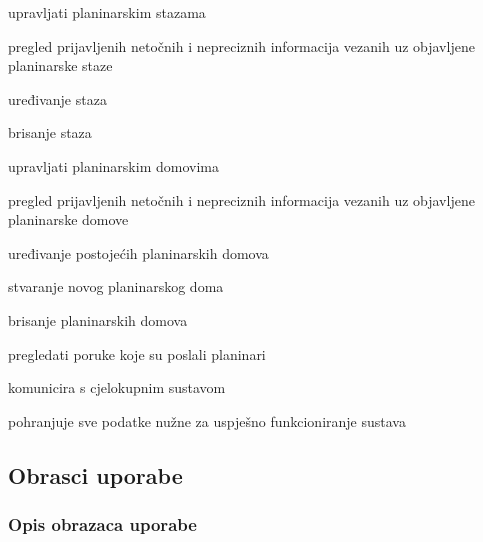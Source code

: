 \begin{packed_enum}
\begin{packed_enum}
\begin{packed_enum}
					\end{packed_enum}
					\item upravljati planinarskim stazama
						\begin{packed_enum}
							\item pregled prijavljenih netočnih i nepreciznih informacija vezanih uz objavljene planinarske staze
							\item uređivanje staza
							\item brisanje staza
						\end{packed_enum}	
					\item upravljati planinarskim domovima
					\begin{packed_enum}
						\item pregled prijavljenih netočnih i nepreciznih informacija vezanih uz objavljene planinarske domove
						\item uređivanje postojećih planinarskih domova
						\item stvaranje novog planinarskog doma
						\item brisanje planinarskih domova
					\end{packed_enum}
					\item pregledati poruke koje su poslali planinari
					
				\end{packed_enum}
	
				\item  {}
				
					\begin{packed_enum}
						
						\item komunicira s cjelokupnim sustavom
						\item pohranjuje sve podatke nužne za uspješno funkcioniranje sustava
						
					\end{packed_enum}
			\end{packed_enum}
			
			\eject 
			
			
				
			\subsection{Obrasci uporabe}
								
				\subsubsection{Opis obrazaca uporabe}
				
